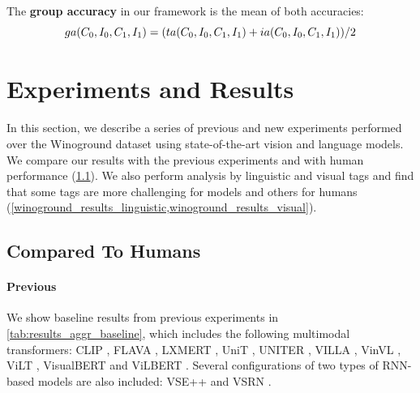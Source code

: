 The \textbf{group accuracy} in our framework is the mean of both accuracies:
\begin{equation}\label{eq:group-accuracy}
        ga(C_{0},I_{0},C_{1},I_{1})= 
        (ta(C_{0},I_{0},C_{1},I_{1}) + ia(C_{0},I_{0},C_{1},I_{1})) / 2\\
\end{equation}

\section{Experiments and Results} \label{sec:winoground_experiments_results}

In this section, we describe a series of previous and new experiments performed over the Winoground dataset using state-of-the-art vision and language models. We compare our results with the previous experiments and with human performance (\cref{sec:winoground_results_humans}). We also perform analysis by linguistic and visual tags and find that some tags are more challenging for models and others for humans (\cref{winoground_results_linguistic,winoground_results_visual}).

\subsection{Compared To Humans} \label{sec:winoground_results_humans}

\paragraph{Previous}

We show baseline results from previous experiments \cite{thrush2022winoground} in \cref{tab:results_aggr_baseline}, which includes the following multimodal transformers: CLIP \cite{radford2021clip}, FLAVA \cite{singh2022flava}, LXMERT \cite{tan2020lxmert}, UniT \cite{hu2021unit}, UNITER \cite{chen2020uniter}, VILLA \cite{gan2020villa}, VinVL \cite{zhang2021vinvl}, ViLT \cite{kim2021vilt}, VisualBERT \cite{li2019visualbert} and ViLBERT \cite{lu2019vilbert}. Several configurations of two types of RNN-based models are also included: VSE++ \cite{faghri2018vse} and VSRN \cite{li2019vsrn}.

